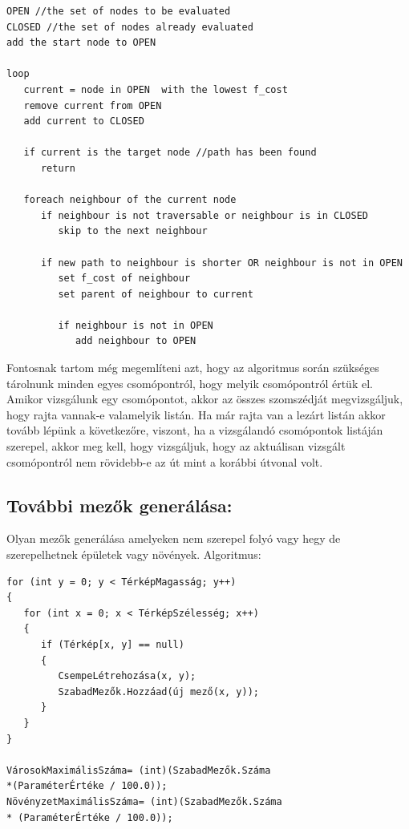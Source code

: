 \begin{verbatim}
OPEN //the set of nodes to be evaluated
CLOSED //the set of nodes already evaluated
add the start node to OPEN

loop
   current = node in OPEN  with the lowest f_cost
   remove current from OPEN
   add current to CLOSED

   if current is the target node //path has been found
      return

   foreach neighbour of the current node
      if neighbour is not traversable or neighbour is in CLOSED
         skip to the next neighbour

      if new path to neighbour is shorter OR neighbour is not in OPEN
         set f_cost of neighbour
         set parent of neighbour to current
         
         if neighbour is not in OPEN
            add neighbour to OPEN
\end{verbatim}

\noindent Fontosnak tartom még megemlíteni azt, hogy az algoritmus során szükséges tárolnunk minden egyes csomópontról, hogy melyik csomópontról értük el. Amikor vizsgálunk egy csomópontot, akkor az összes szomszédját megvizsgáljuk, hogy rajta vannak-e valamelyik listán. Ha már rajta van a lezárt listán akkor tovább lépünk a következőre, viszont, ha a vizsgálandó csomópontok listáján szerepel, akkor meg kell, hogy vizsgáljuk, hogy az aktuálisan vizsgált csomópontról nem rövidebb-e az út mint a korábbi útvonal volt.

\subsection{További mezők generálása:}

Olyan mezők generálása amelyeken nem szerepel folyó vagy hegy de szerepelhetnek épületek vagy növények.
\newline
\newline Algoritmus:   

\begin{verbatim}
for (int y = 0; y < TérképMagasság; y++)
{
   for (int x = 0; x < TérképSzélesség; x++)
   {
      if (Térkép[x, y] == null)
      {
         CsempeLétrehozása(x, y);
         SzabadMezők.Hozzáad(új mező(x, y));
      }
   }
}

VárosokMaximálisSzáma= (int)(SzabadMezők.Száma 
*(ParaméterÉrtéke / 100.0));
NövényzetMaximálisSzáma= (int)(SzabadMezők.Száma 
* (ParaméterÉrtéke / 100.0));
\end{verbatim}


